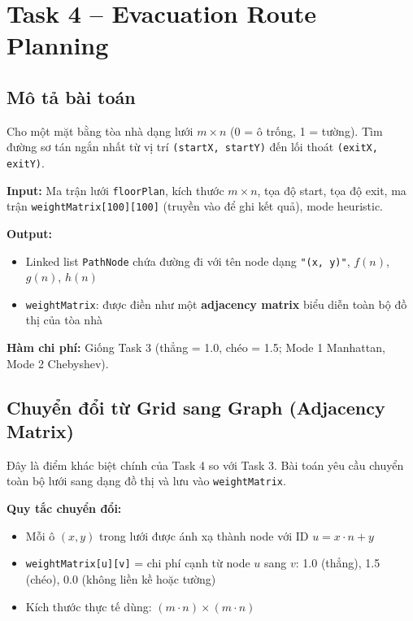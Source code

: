 \documentclass[13pt,a4paper]{article}
\begin{document}
\newpage

\section{Task 4 -- Evacuation Route Planning}

\subsection{Mô tả bài toán}

Cho một mặt bằng tòa nhà dạng lưới $m \times n$ (0 = ô trống, 1 = tường). Tìm đường sơ tán ngắn nhất từ vị trí \texttt{(startX, startY)} đến lối thoát \texttt{(exitX, exitY)}.

\textbf{Input:} Ma trận lưới \texttt{floorPlan}, kích thước $m \times n$, tọa độ start, tọa độ exit, ma trận \texttt{weightMatrix[100][100]} (truyền vào để ghi kết quả), mode heuristic.

\textbf{Output:}
\begin{itemize}
    \item Linked list \texttt{PathNode} chứa đường đi với tên node dạng \texttt{"(x, y)"}, $f(n)$, $g(n)$, $h(n)$
    \item \texttt{weightMatrix}: được điền như một \textbf{adjacency matrix} biểu diễn toàn bộ đồ thị của tòa nhà
\end{itemize}

\textbf{Hàm chi phí:} Giống Task 3 (thẳng = 1.0, chéo = 1.5; Mode 1 Manhattan, Mode 2 Chebyshev).

\subsection{Chuyển đổi từ Grid sang Graph (Adjacency Matrix)}

Đây là điểm khác biệt chính của Task 4 so với Task 3. Bài toán yêu cầu chuyển toàn bộ lưới sang dạng đồ thị và lưu vào \texttt{weightMatrix}.

\textbf{Quy tắc chuyển đổi:}
\begin{itemize}
    \item Mỗi ô $(x, y)$ trong lưới được ánh xạ thành node với ID $u = x \cdot n + y$
    \item \texttt{weightMatrix[u][v]} = chi phí cạnh từ node $u$ sang $v$: 1.0 (thẳng), 1.5 (chéo), 0.0 (không liền kề hoặc tường)
    \item Kích thước thực tế dùng: $(m \cdot n) \times (m \cdot n)$
\end{itemize}
\end{document}

